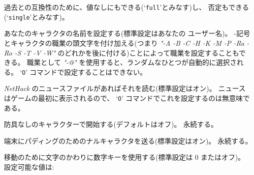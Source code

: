過去との互換性のために、値なしにもできる(`{\tt full}'とみなす)し、
否定もできる(`{\tt single}'とみなす)。
\item[\ib{name}]
あなたのキャラクタの名前を設定する(標準設定はあなたの ユーザー名)。
-記号とキャラクタの職業の頭文字を付け加える(つまり
{\it "-A -B -C -H -K -M -P -Ra -Ro -S -T -V -W"\/}
のどれかを後に付ける)ことによって職業を設定することもできる。
職業として
{\it "-@"\/}
を使用すると、ランダムなひとつが自動的に選択される。
`{\tt O}' コマンドで設定することはできない。
\item[\ib{news}]
{\it NetHack\/} のニュースファイルがあればそれを読む(標準設定はオン)。
ニュースはゲームの最初に表示されるので、
`{\tt O}' コマンドでこれを設定するのは無意味である。
\item[\ib{nudist}]
防具なしのキャラクターで開始する(デフォルトはオフ)。
永続する。
\item[\ib{null}]
端末にパディングのためのナルキャラクタを送る(標準設定はオン)。
永続する。
\item[\ib{number\verb+_+pad}]
移動のために文字のかわりに数字キーを使用する(標準設定は 0 またはオフ)。
設定可能な値は:


